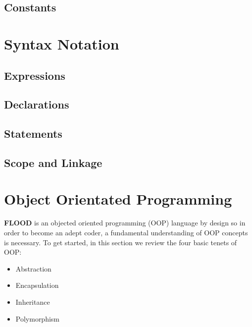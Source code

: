 \documentclass[12pt]{report}
\begin{document}
\subsection{Constants}

\section{Syntax Notation}

\subsection{Expressions}

\subsection{Declarations}

\subsection{Statements}

\subsection{Scope and Linkage}

\section{Object Orientated Programming}

\begin{doublespace}
\textbf{FLOOD} is an objected oriented programming (OOP) language by design so in order to become an adept coder, a fundamental understanding of OOP concepts is necessary. To get started, in this section we review the four basic tenets of OOP:
\begin{itemize}
\setlength{\itemsep}{1pt}
\item Abstraction
\item Encapsulation
\item Inheritance
\item Polymorphism
\end{itemize}
\end{doublespace}
\end{document}
